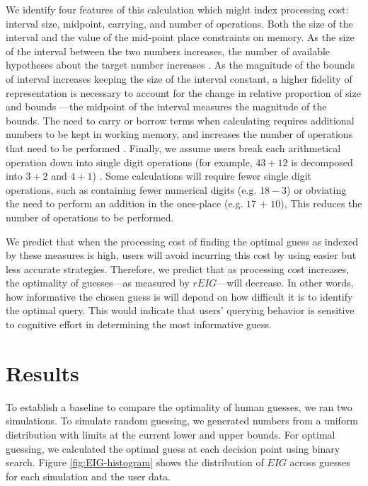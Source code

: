 \documentclass[10pt,letterpaper]{article}
\begin{document}
We identify four features of this calculation which might index processing cost: interval size, midpoint, carrying, and number of operations.
Both the size of the interval and the value of the mid-point place constraints on memory. As the size of the interval between the two numbers increases, the number of available hypotheses about the target number increases \cite{zbrodoff19959+}. As the magnitude of the bounds of interval increases keeping the size of the interval constant, a higher fidelity of representation is necessary to account for the change in relative proportion of size and bounds \cite{DEHAENE2003145}---the midpoint of the interval measures the magnitude of the bounds.  
The need to carry or borrow terms when calculating requires additional numbers to be kept in working memory, and increases the number of operations that need to be performed \cite{imbo2007role2}.
Finally, we assume users break each arithmetical operation down into single digit operations (for example, $43 + 12$ is decomposed into $3 + 2$ and $4 + 1$) \cite{hitch1978role}. Some calculations will require fewer single digit operations, such as containing fewer numerical digits (e.g. $18 - 3$) or obviating the need to perform an addition in the ones-place (e.g. $17$ +  $10$), This reduces the number of operations to be performed. 

We predict that when the processing cost of finding the optimal guess as indexed by these measures is high, users will avoid incurring this cost by using easier but less accurate strategies. Therefore, we predict that as processing cost increases, the optimality of guesses---as measured by $rEIG$---will decrease. In other words, how informative the chosen guess is will depond on how difficult it is to identify the optimal query. This would indicate that users' querying behavior is sensitive to cognitive effort in determining the most informative guess.

\section{Results}

To establish a baseline to compare the optimality of human guesses, we ran two simulations. To simulate random guessing, we generated numbers from a uniform distribution with limits at the current lower and upper bounds. For optimal guessing, we calculated the optimal guess at each decision point using binary search. Figure \ref{fig:EIG-histogram} shows the distribution of $EIG$ across guesses for each simulation and the user data.
\end{document}
